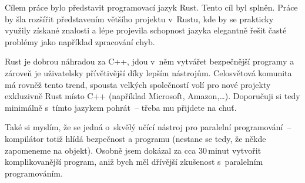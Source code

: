 \documentclass[main.tex]{subfiles}
\begin{document}

Cílem práce bylo představit programovací jazyk Rust. Tento cíl byl splněn. Práce by šla
rozšířit představením většího projektu v~Rustu, kde by se prakticky využily získané
znalosti a lépe projevila schopnost jazyka elegantně řešit časté problémy jako například
zpracování chyb.

Rust je dobrou náhradou za C++, jdou v~něm vytvářet bezpečnější programy a zároveň je
uživatelsky přívětivější díky lepším nástrojům. Celosvětová komunita má rovněž tento
trend, spousta velkých společností volí pro nové projekty exkluzivně Rust místo C++
(například Microsoft, Amazon,\dots). Doporučuji si tedy minimálně s~tímto jazykem
pohrát~-- třeba mu přijdete na chuť.

Také si myslím, že se jedná o~skvělý učící nástroj pro paralelní programování~--
kompilátor totiž hlídá bezpečnost a  programu (nestane se tedy, že někde
zapomeneme na  objekt). Osobně jsem dokázal za cca 30\,minut vytvořit
komplikovanější program, aniž bych měl dřívější zkušenost s~paralelním programováním.
\end{document}

